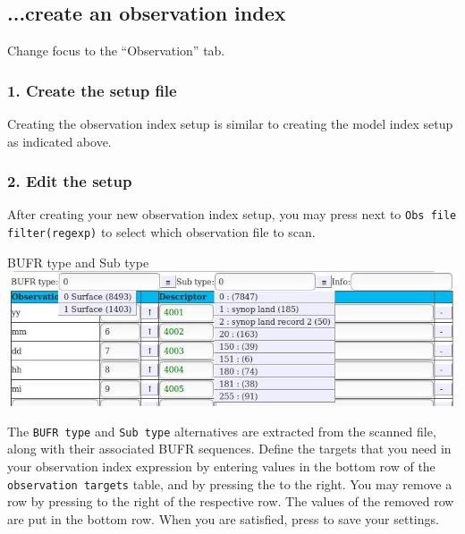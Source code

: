 \documentclass[letterpaper,10pt,twoside,twocolumn,openany]{book}
\begin{document}
{\subsection{...create an observation index}
Change focus to the ``Observation'' tab. 

\subsubsection{1. Create the setup file}
Creating the observation index setup is similar to creating the model index setup as indicated above.

\subsubsection{2. Edit the setup}
After creating your new observation index setup, 
you may press  next to
\lstinline!Obs file filter(regexp)! to select which observation file to scan.
\begin{paperbox}{BUFR type and Sub type}
  \includegraphics[width=\columnwidth]{how_obs.jpg}
\end{paperbox}
The \lstinline!BUFR type! and \lstinline!Sub type! alternatives are extracted from the scanned file,
along with their associated BUFR sequences.
Define the targets that you need in your observation index expression by entering values
in the bottom row of the \lstinline!observation targets! table, and by pressing the  to the right.
You may remove a row by pressing   to the right of the respective row.
The values of the removed row are put in the bottom row.
When you are satisfied, press  to save your settings.

}
\end{document}
